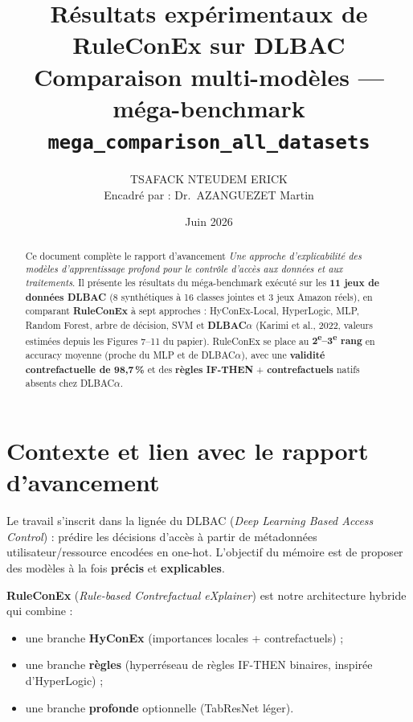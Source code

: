 \documentclass[11pt,a4paper]{article}
\title{\textcolor{titleblue}{\textbf{Résultats expérimentaux de RuleConEx sur DLBAC}}\\
\large Comparaison multi-modèles — méga-benchmark \texttt{mega\_comparison\_all\_datasets}}
\author{TSAFACK NTEUDEM ERICK\\
\small Encadré par : Dr.\ AZANGUEZET Martin}
\date{Juin 2026}
\begin{document}
\maketitle

\begin{abstract}
Ce document complète le rapport d'avancement \emph{Une approche d'explicabilité des modèles d'apprentissage profond pour le contrôle d'accès aux données et aux traitements}. Il présente les résultats du méga-benchmark exécuté sur les \textbf{11 jeux de données DLBAC} (8 synthétiques à 16 classes jointes et 3 jeux Amazon réels), en comparant \textbf{RuleConEx} à sept approches : HyConEx-Local, HyperLogic, MLP, Random Forest, arbre de décision, SVM et \textbf{DLBAC$\alpha$} (Karimi et al., 2022, valeurs estimées depuis les Figures 7--11 du papier). RuleConEx se place au \textbf{2\textsuperscript{e}--3\textsuperscript{e} rang} en accuracy moyenne (proche du MLP et de DLBAC$\alpha$), avec une \textbf{validité contrefactuelle de 98{,}7\,\%} et des \textbf{règles IF-THEN} + \textbf{contrefactuels} natifs absents chez DLBAC$\alpha$.
\end{abstract}

\tableofcontents
\newpage

\section{Contexte et lien avec le rapport d'avancement}

Le travail s'inscrit dans la lignée du DLBAC (\emph{Deep Learning Based Access Control}) : prédire les décisions d'accès à partir de métadonnées utilisateur/ressource encodées en one-hot. L'objectif du mémoire est de proposer des modèles à la fois \textbf{précis} et \textbf{explicables}.

\textbf{RuleConEx} (\emph{Rule-based Contrefactual eXplainer}) est notre architecture hybride qui combine :
\begin{itemize}
  \item une branche \textbf{HyConEx} (importances locales + contrefactuels) ;
  \item une branche \textbf{règles} (hyperréseau de règles IF-THEN binaires, inspirée d'HyperLogic) ;
  \item une branche \textbf{profonde} optionnelle (TabResNet léger).
\end{itemize}
\end{document}
